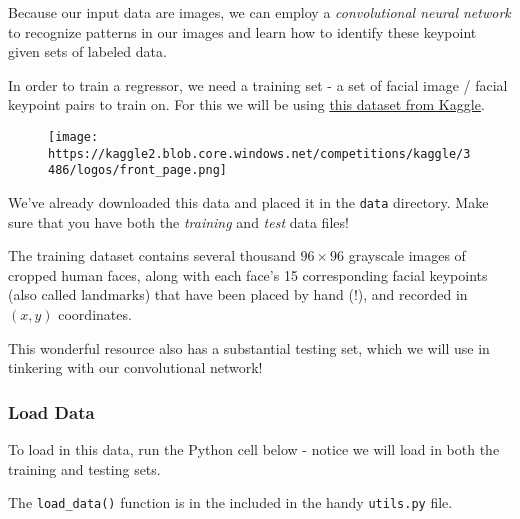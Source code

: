 \documentclass[11pt]{article}
\makeatletter
\def\maxwidth{\ifdim\Gin@nat@width>\linewidth\linewidth
    \else\Gin@nat@width\fi}
\let\Oldincludegraphics\includegraphics
\renewcommand{\includegraphics}[1]{\Oldincludegraphics[width=.8\maxwidth]{#1}}
\makeatother
\begin{document}
Because our input data are images, we can employ a \emph{convolutional
neural network} to recognize patterns in our images and learn how to
identify these keypoint given sets of labeled data.

In order to train a regressor, we need a training set - a set of facial
image / facial keypoint pairs to train on. For this we will be using
\href{https://www.kaggle.com/c/facial-keypoints-detection/data}{this
dataset from Kaggle}.

\begin{figure}
\centering
\texttt{[image: https://kaggle2.blob.core.windows.net/competitions/kaggle/3486/logos/front\_page.png]}
\caption{}
\end{figure}

    We've already downloaded this data and placed it in the \texttt{data}
directory. Make sure that you have both the \emph{training} and
\emph{test} data files!

The training dataset contains several thousand \(96 \times 96\)
grayscale images of cropped human faces, along with each face's 15
corresponding facial keypoints (also called landmarks) that have been
placed by hand (!), and recorded in \((x, y)\) coordinates.

This wonderful resource also has a substantial testing set, which we
will use in tinkering with our convolutional network!

\subsubsection{Load Data}\label{load-data}

To load in this data, run the Python cell below - notice we will load in
both the training and testing sets.

The \texttt{load\_data()} function is in the included in the handy
\texttt{utils.py} file.
\end{document}
